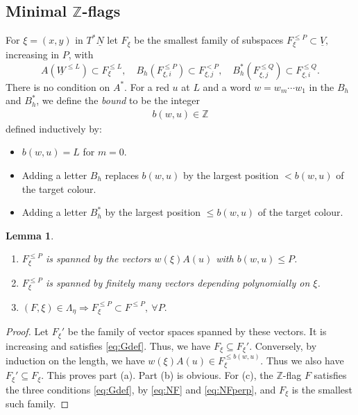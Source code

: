 \documentclass[11pt,reqno]{amsart}
\newtheorem{Lemma}[Theorem]{Lemma}
\theoremstyle{definition}
\theoremstyle{remark}
\def\bbZ{\mathbb Z}
\def\dN{\underline N}
\def\dV{\underline V}
\def\dW{\underline W}
\begin{document}
\subsection{Minimal $\bbZ$-flags}
For $\xi=(x,y)$ in $T^*\dN$ let $F_\xi$ be the smallest family of subspaces 
$F_\xi^{\leqslant P}\subset\dV,$ increasing in $P$, with
\begin{equation}\label{eq:Gdef}
A(\dW^{\leqslant L})\subset F_\xi^{\leqslant L},\quad 
B_h(F_{\xi,i}^{\leqslant P})\subset F_{\xi,j}^{<P}
,\quad 
B^*_h(F_{\xi,j}^{\leqslant Q})\subset F_{\xi,i}^{\leqslant Q}.
\end{equation}
There is no condition on $A^*$. 
For a red $u$ at $L$ and a word $w=w_m\cdots w_1$ in the $B_h$ and $B_h^*$, 
we define the \emph{bound} to be the integer
\begin{align}\label{bound}b(w,u)\in\mathbb Z\end{align}
 defined inductively by: 
 \begin{itemize}[leftmargin=8mm]
 \item $b(w,u)=L$ for $m=0$.
\item Adding a letter $B_h$ replaces $b(w,u)$ by the largest position $<b(w,u)$ of the target colour. 
\item Adding a letter $B^*_h$ by the largest position $\leqslant b(w,u)$ of the target colour.
\end{itemize}

\begin{Lemma}\label{lem:words}\hfill
\begin{enumerate}[label=$\mathrm{(\alph*)}$,leftmargin=8mm]
\item
$F_\xi^{\leqslant P}$ is spanned by the vectors $w(\xi)A(u)$ with $b(w,u)\leqslant P$. 
\item
$F_{\xi}^{\leqslant P}$ is spanned by finitely many vectors depending polynomially on $\xi$.
\item
$(F,\xi)\in\Lambda_\eta\Rightarrow F_\xi^{\leqslant P}\subset F^{\leqslant P},\ \forall P.$
\end{enumerate}
\end{Lemma}

\begin{proof}
Let $F_\xi'$ be the family of vector spaces spanned by these vectors.
It is increasing and satisfies \eqref{eq:Gdef}.
Thus, we have $F_\xi\subseteq F_\xi'.$
Conversely, by induction on the length, we have $w(\xi)A(u)\in F_\xi^{\leqslant b(w,u)}$.
Thus we also have
$F_\xi'\subseteq F_\xi.$
This proves part (a). Part (b) is obvious.
For (c), the $\bbZ$-flag 
$F$ satisfies the three conditions \eqref{eq:Gdef}, by \eqref{eq:NF} and \eqref{eq:NFperp}, and $F_\xi$ is the smallest such family.
\end{proof}
\end{document}

